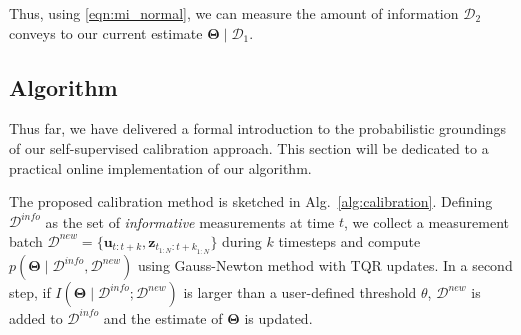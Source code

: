 Thus, using \eqref{eqn:mi_normal}, we can measure the amount of information
$\mathcal{D}_2$ conveys to our current estimate
$\boldsymbol{\Theta}\mid\mathcal{D}_1$.

\subsection{Algorithm}

Thus far, we have delivered a formal introduction to the probabilistic
groundings of our self-supervised calibration approach. This section will be
dedicated to a practical online implementation of our algorithm.

The proposed calibration method is sketched in Alg.~\ref{alg:calibration}.
Defining $\mathcal{D}^{info}$ as the set of \emph{informative} measurements at
time $t$, we collect a measurement batch
$\mathcal{D}^{new}=\{\mathbf{u}_{t:t+k}, \mathbf{z}_{t_{1:N}:{t+k}_{1:N}}\}$
during $k$ timesteps and compute
$p(\mathbf{\Theta}\mid\mathcal{D}^{info},\mathcal{D}^{new})$ using Gauss-Newton
method with TQR updates. In a second step, if
$I(\mathbf{\Theta}\mid\mathcal{D}^{info};\mathcal{D}^{new})$ is larger
than a user-defined threshold $\theta$, $\mathcal{D}^{new}$ is added to
$\mathcal{D}^{info}$ and the estimate of $\mathbf{\Theta}$ is updated.

